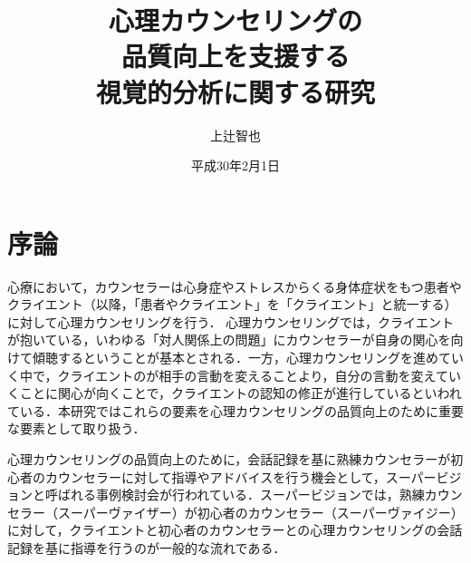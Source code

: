 \documentclass[shuuron]{kuee}
\title{心理カウンセリングの\\品質向上を支援する\\視覚的分析に関する研究}
\author{上辻智也}
\date{平成30年2月1日}
\begin{document}
\maketitle
\tableofcontents

%   

\chapter{序論}

心療において，カウンセラーは心身症やストレスからくる身体症状をもつ患者やクライエント（以降，「患者やクライエント」を「クライエント」と統一する）に対して心理カウンセリングを行う．
心理カウンセリングでは，クライエントが抱いている，いわゆる「対人関係上の問題」にカウンセラーが自身の関心を向けて傾聴するということが基本とされる\cite{zokad}．一方，心理カウンセリングを進めていく中で，クライエントのが相手の言動を変えることより，自分の言動を変えていくことに関心が向くことで，クライエントの認知の修正が進行しているといわれている\cite{Darshana}．本研究ではこれらの要素を心理カウンセリングの品質向上のために重要な要素として取り扱う．



心理カウンセリングの品質向上のために，会話記録を基に熟練カウンセラーが初心者のカウンセラーに対して指導やアドバイスを行う機会として，スーパービジョンと呼ばれる事例検討会が行われている．スーパービジョンでは，熟練カウンセラー（スーパーヴァイザー）が初心者のカウンセラー（スーパーヴァイジー）に対して，クライエントと初心者のカウンセラーとの心理カウンセリングの会話記録を基に指導を行うのが一般的な流れである．%

\end{document}
